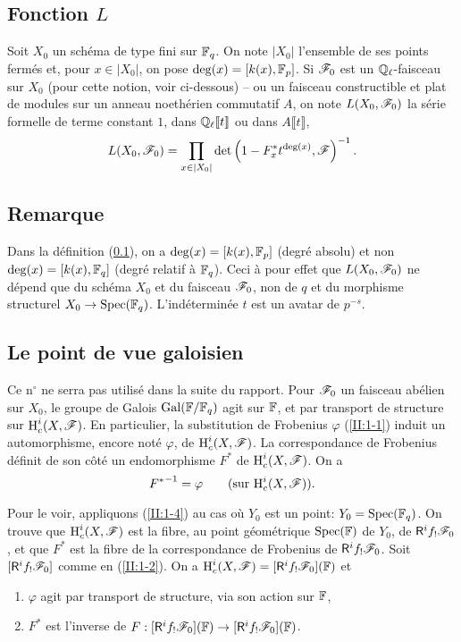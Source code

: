 \subsection{Fonction \texorpdfstring{$L$}{L}}\label{II:1-6}

Soit $X_0$ un schéma de type fini sur $\mathbb{F}_q$. On note $|X_0|$ l'ensemble de 
ses points fermés et, pour $x\in |X_0|$, on pose $\deg(x)=[k(x),\mathbb{F}_p]$. Si 
$\mathscr{F}_0$ est un $\mathbb{Q}_\ell$-faisceau sur $X_0$ (pour cette notion, voir 
ci-dessous) -- ou un faisceau constructible et plat de modules sur un 
anneau noethérien commutatif $A$, on note $L(X_0,\mathscr{F}_0)$ la série formelle 
de terme constant $1$, dans $\mathbb{Q}_\ell\llbracket t\rrbracket$ ou dans 
$A\llbracket t\rrbracket$, 
\[
  L(X_0,\mathscr{F}_0) = \prod_{x\in|X_0|} \det\left(1-F_x^* t^{\deg(x)},\mathscr{F}\right)^{-1} \text{.}
\]





\subsection{Remarque}\label{II:1-7}

Dans la définition (\ref{II:1-6}), on a $\deg(x)=[k(x),\mathbb{F}_p]$ (degré 
absolu) et non $\deg(x)=[k(x),\mathbb{F}_q]$ (degré relatif à $\mathbb{F}_q$). Ceci à 
pour effet que $L(X_0,\mathscr{F}_0)$ ne dépend que du schéma $X_0$ et du faisceau 
$\mathscr{F}_0$, non de $q$ et du morphisme structurel $X_0\to\operatorname{Spec}(\mathbb{F}_q)$. 
L'indéterminée $t$ est un avatar de $p^{-s}$. 





\subsection{Le point de vue galoisien}\label{II:1-8}

Ce n$^\circ$ ne serra pas utilisé dans la suite du rapport. Pour $\mathscr{F}_0$ un 
faisceau abélien sur $X_0$, le groupe de Galois $\operatorname{Gal}(\mathbb{F}/\mathbb{F}_q)$ agit sur 
$\mathbb{F}$, et par transport de structure sur $\operatorname{H}_c^i(X,\mathscr{F})$. En particulier, la 
substitution de Frobenius $\varphi$ (\ref{II:1-1}) induit un automorphisme, 
encore noté $\varphi$, de $\operatorname{H}_c^i(X,\mathscr{F})$. La correspondance de Frobenius 
définit de son côté un endomorphisme $F^*$ de $\operatorname{H}_c^i(X,\mathscr{F})$. On a 
\begin{equation}\label{II:eq:1-8-1}
  {F^*}^{-1} = \varphi \qquad \text{(sur $\operatorname{H}_c^i(X,\mathscr{F})$).}
\end{equation}

Pour le voir, appliquons (\ref{II:1-4}) au cas où $Y_0$ est un point: 
$Y_0=\operatorname{Spec}(\mathbb{F}_q)$. On trouve que $\operatorname{H}_c^i(X,\mathscr{F})$ est la fibre, au point 
géométrique $\operatorname{Spec}(\mathbb{F})$ de $Y_0$, de $\mathsf{R}^i f_! \mathscr{F}_0$, et que $F^*$ est 
la fibre de la correspondance de Frobenius de $\mathsf{R}^i f_!\mathscr{F}_0$. Soit 
$[\mathsf{R}^i f_! \mathscr{F}_0]$ comme en (\ref{II:1-2}). On a 
$\operatorname{H}_c^i(X,\mathscr{F}) = [\mathsf{R}^i f_!\mathscr{F}_0](\mathbb{F})$ et 
\begin{enumerate}[\indent a)]
  \item $\varphi$ agit par transport de structure, via son action sur $\mathbb{F}$, 
  \item $F^*$ est l'inverse de 
    $F:[\mathsf{R}^i f_!\mathscr{F}_0](\mathbb{F}) \to [\mathsf{R}^i f_!\mathscr{F}_0](\mathbb{F})$. 
\end{enumerate}

